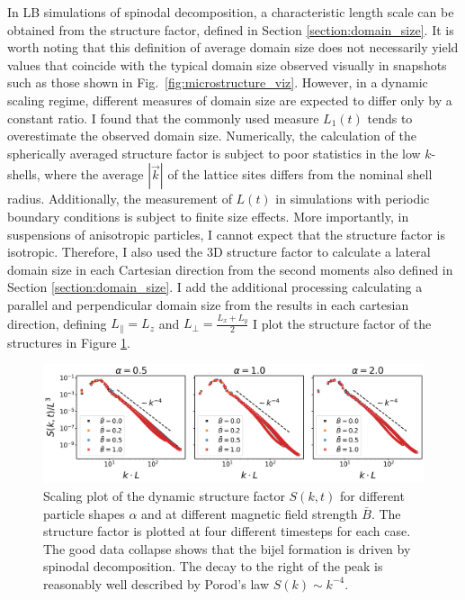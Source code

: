 In LB simulations of spinodal decomposition, a characteristic length
scale can be obtained from the structure factor, defined in Section \ref{section:domain_size}. \cite{kendon_3d_1999,kendon_inertial_2001} 
It is worth noting that this definition of average domain size does not necessarily yield values that coincide with the typical
domain size observed visually in snapshots such as those shown in Fig.~\ref{fig:microstructure_viz}. However, in a dynamic
scaling regime, different measures of domain size are expected to differ only by a constant ratio. I found that the commonly 
used measure \(L_1(t)\) tends to overestimate the observed domain size. Numerically, the calculation of the spherically 
averaged structure factor is subject to poor statistics in the low \(k\)-shells, where the average \(|\vec{k}|\) of the 
lattice sites differs from the nominal shell radius. Additionally, the measurement of \(L(t)\) in simulations with
periodic boundary conditions is subject to finite size effects. More importantly, in suspensions of anisotropic particles, 
I cannot expect that the structure factor is isotropic. Therefore, I also used the 3D structure factor to calculate a lateral domain 
size in each Cartesian direction from the second moments also defined in Section \ref{section:domain_size}. 
\cite{jansen_bijels_2011,gunther_timescales_2014} I add the additional processing calculating a parallel and perpendicular domain size
from the results in each cartesian direction, defining $L_{\parallel}=L_z$ and $L_{\perp} = \frac{L_x+L_y}{2}$ I plot the structure factor of the structures in
Figure \ref{fig:structure_factor}.

\begin{figure}
    \centering
    \includegraphics[width=\textwidth]{figures/results/paper1/structure_factor.png}
    \caption{Scaling plot of the dynamic structure factor $S(k,t)$ for different particle shapes $\alpha$ and at different 
            magnetic field strength $\bar{B}$. The structure factor is plotted at four different timesteps for each case. The good data collapse shows that the 
            bijel formation is driven by spinodal decomposition. The decay to the right of the peak is reasonably well described by Porod's law $S(k)\sim k^{-4}$.}
    \label{fig:structure_factor}
\end{figure}

